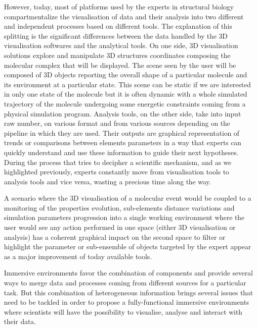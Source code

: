 \documentclass{vgtc}                          %
\begin{document}
However, today, most of platforms used by the experts in structural biology compartmentalize the visualisation of data and their analysis into two different and independent processes based on different tools.
The explanation of this splitting is the significant differences between the data handled by the 3D visualisation softwares and the analytical tools.
On one side, 3D visualisation solutions explore and manipulate 3D structures coordinates composing the molecular complex that will be displayed. The scene seen by the user will be composed of 3D objects reporting the overall shape of a particular molecule and its environment at a particular state. This scene can be static if we are interested in only one state of the molecule but it is often dynamic with a whole simulated trajectory of the molecule undergoing some energetic constraints coming from a physical simulation program.
Analysis tools, on the other side, take into input raw number, on various format and from various sources depending on the pipeline in which they are used. Their outputs are graphical representation of trends or comparisons between elements parameters in a way that experts can quickly understand and use these information to guide their next hypotheses.
During the process that tries to decipher a scientific mechanism, and as we highlighted previously, experts constantly move from visualisation tools to analysis tools and vice versa, wasting a precious time along the way.

A scenario where the 3D visualisation of a molecular event would be coupled to a monitoring of the properties evolution, sub-elements distance variations and simulation parameters progression into a single working environment where the user would see any action performed in one space (either 3D visualisation or analysis) has a coherent graphical impact on the second space to filter or highlight the parameter or sub-ensemble of objects targeted by the expert appear as a major improvement of today available tools.

Immersive environments favor the combination of components and provide several ways to merge 
data and processes coming from different sources for a particular task. But this combination of heterogeneous information brings several issues that need to be tackled in order to propose a fully-functional immersive environments where scientists will have the possibility to visualise, analyse and interact with their data.
\end{document}
